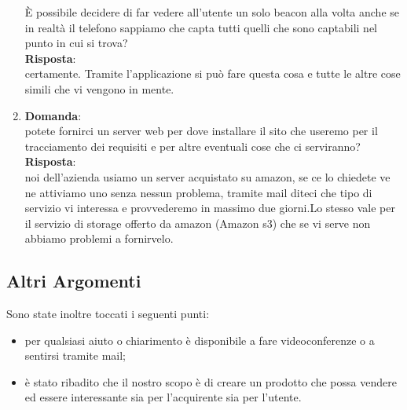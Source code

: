 \documentclass[a4paper,titlepage]{article}
\begin{document}
\begin{enumerate}
  È possibile decidere di far vedere all'utente un solo beacon alla volta anche se in realtà il telefono sappiamo che capta tutti quelli che sono captabili nel punto in cui si trova?\\
  \textbf{Risposta}: \\ 
  certamente. Tramite l'applicazione si può fare questa cosa e tutte le altre cose simili che vi vengono in mente.
  \item \textbf{Domanda}:\\
  potete fornirci un server web per dove installare il sito che useremo per il tracciamento dei requisiti e per altre eventuali cose che ci serviranno?\\
  \textbf{Risposta}: \\
  noi dell'azienda usiamo un server acquistato su amazon, se ce lo chiedete ve ne attiviamo uno senza nessun problema, tramite mail diteci che tipo di servizio vi interessa e provvederemo in massimo due giorni.Lo stesso vale per il servizio di storage offerto da amazon (Amazon s3) che se vi serve non abbiamo problemi a fornirvelo.
\end{enumerate}

\subsection{Altri Argomenti}
\label{sub:AltriArgomenti}

Sono state inoltre toccati i seguenti punti:

\begin{itemize}
  \item per qualsiasi aiuto o chiarimento \PROPONENTE è disponibile a fare videoconferenze o a sentirsi tramite mail;
  \item è stato ribadito che il nostro scopo è di creare un prodotto che possa vendere ed essere interessante sia per l'acquirente sia per l'utente.
\end{itemize}
\end{document}
